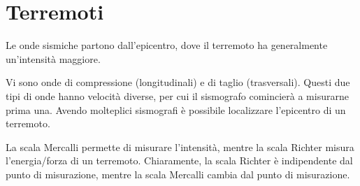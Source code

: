 \documentclass[a4paper]{article}
\begin{document}
\pagebreak

\section{Terremoti}



Le onde sismiche partono dall'epicentro, dove il terremoto ha generalmente un'intensità maggiore.

Vi sono onde di compressione (longitudinali) e di taglio (trasversali).
Questi due tipi di onde hanno velocità diverse, per cui il sismografo comincierà a misurarne
prima una.
Avendo molteplici sismografi è possibile localizzare l'epicentro di un terremoto.

La scala Mercalli permette di misurare l'intensità, mentre la scala Richter misura l'energia/forza di un terremoto.
Chiaramente, la scala Richter è indipendente dal punto di misurazione, mentre la scala Mercalli cambia dal punto di misurazione.

\end{document}
